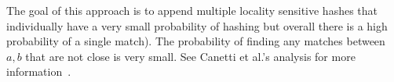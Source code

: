 The goal of this approach is to append multiple locality sensitive hashes that individually have a very small probability of hashing but overall there is a high probability of a single match).  The probability of finding any matches between $a,b$ that are not close is very small.  See Canetti et al.'s analysis for more information~\cite{EC:CFPRS16}.
%
%
%
%
%
